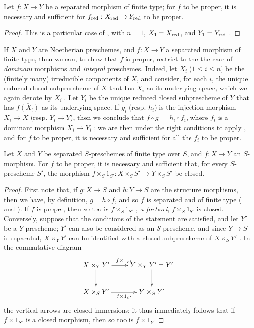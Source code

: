 \begin{cor}[5.4.6]
\label{2.5.4.6}
Let $f:X\to Y$ be a separated morphism of finite type;
for $f$ to be proper, it is necessary and sufficient for $f_\red:X_\red\to Y_\red$ to be proper.
\end{cor}

\begin{proof}
\label{proof-2.5.4.6}
This is a particular case of , with $n=1$, $X_1=X_{\mathrm{red}}$, and $Y_1=Y_{\mathrm{red}}$ .
\end{proof}

\begin{env}[5.4.7]
\label{2.5.4.7}
If $X$ and $Y$ are Noetherian preschemes, and $f:X\to Y$ a separated morphism of finite type, then we can, to show that $f$ is proper, restrict to the the case of \emph{dominant} morphisms and \emph{integral} preschemes.
Indeed, let $X_i$ ($1\leq i\leq n$) be the (finitely many) irreducible components of $X$, and consider, for each $i$, the unique reduced closed subprescheme of $X$ that has $X_i$ as its underlying space, which we again denote by $X_i$ .
Let $Y_i$ be the unique reduced closed subprescheme of $Y$ that has $\overline{f(X_i)}$ as its underlying space.
If $g_i$ (resp. $h_i$) is the injection morphism $X_i\to X$ (resp. $Y_i\to Y$), then we conclude that $f\circ g_i=h_i\circ f_i$, where $f_i$ is a dominant morphism $X_i\to Y_i$ ;
we are then under the right conditions to apply , and for $f$ to be proper, it is necessary and sufficient for all the $f_i$ to be proper.
\end{env}

\begin{cor}[5.4.8]
\label{2.5.4.8}
Let $X$ and $Y$ be separated $S$-preschemes of finite type over $S$, and $f:X\to Y$ an $S$-morphism.
For $f$ to be proper, it is necessary and sufficient that, for every $S$-prescheme $S'$, the morphism $f\times_S 1_{S'}:X\times_S S'\to Y\times_S S'$ be closed.
\end{cor}

\begin{proof}
\label{proof-2.5.4.8}
First note that, if $g:X\to S$ and $h:Y\to S$ are the structure morphisms, then we have, by definition, $g=h\circ f$, and so $f$ is separated and of finite type ( and ).
If $f$ is proper, then so too is $f\times_S 1_{S'}$ ;
\emph{a fortiori}, $f\times_S 1_{S'}$ is closed.
Conversely, suppose that the conditions of the statement are satisfied, and let $Y'$ be a $Y$-prescheme;
$Y'$ can also be considered as an $S$-prescheme, and since $Y\to S$ is separated, $X\times_Y Y'$ can be identified with a closed subprescheme of $X\times_S Y'$ .
In the commutative diagram
\[
  \xymatrix{
    X\times_Y Y' \ar[r]^{f\times1_{Y'}} \ar[d]
    & Y\times_Y Y'=Y' \ar[d]\\
    X\times_S Y' \ar[r]_{f\times1_{S'}}
    & Y\times_S Y'
  }
\]
the vertical arrows are closed immersions;
it thus immediately follows that if $f\times1_{S'}$ is a closed morphism, then so too is $f\times1_{Y'}$
\end{proof}

